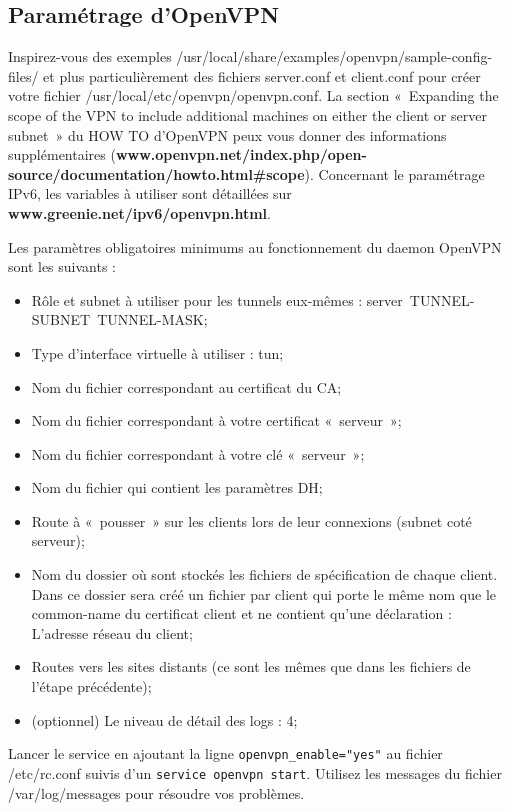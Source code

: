 \documentclass[a4paper,11pt]{article}
\newcommand{\shellcmd}[1]{\texttt{#1}}
\begin{document}
\subsection{Paramétrage d'OpenVPN}
Inspirez-vous des exemples /usr/local/share/examples/openvpn/sample-config-files/ et plus particulièrement des fichiers server.conf et client.conf pour créer votre fichier /usr/local/etc/openvpn/openvpn.conf.
La section «~Expanding the scope of the VPN to include additional machines on either the client or server subnet~» du HOW TO d'OpenVPN peux vous donner des informations supplémentaires (\textbf{www.openvpn.net/index.php/open-source/documentation/howto.html\#scope}).
Concernant le paramétrage IPv6, les variables à utiliser sont détaillées sur \textbf{www.greenie.net/ipv6/openvpn.html}.

Les paramètres obligatoires minimums au fonctionnement du daemon OpenVPN sont les suivants :
\begin{itemize}
\item Rôle et subnet à utiliser pour les tunnels eux-mêmes : server~TUNNEL-SUBNET~TUNNEL-MASK;
\item Type d'interface virtuelle à utiliser : tun;
\item Nom du fichier correspondant au certificat du CA;
\item Nom du fichier correspondant à votre certificat «~serveur~»;
\item Nom du fichier correspondant à votre clé «~serveur~»;
\item Nom du fichier qui contient les paramètres DH;
\item Route à «~pousser~» sur les clients lors de leur connexions (subnet coté serveur);
\item Nom du dossier où sont stockés les fichiers de spécification de chaque client. Dans ce dossier sera créé un fichier par client qui porte le même nom que le common-name du certificat client et ne contient qu'une déclaration : L'adresse réseau du client;
\item Routes vers les sites distants (ce sont les mêmes que dans les fichiers de l'étape précédente);
\item (optionnel) Le niveau de détail des logs : 4;
\end{itemize}

Lancer le service en ajoutant la ligne \shellcmd{openvpn\_enable="yes"} au fichier /etc/rc.conf suivis d'un \shellcmd{service openvpn start}. Utilisez les messages du fichier /var/log/messages pour résoudre vos problèmes.
\end{document}
